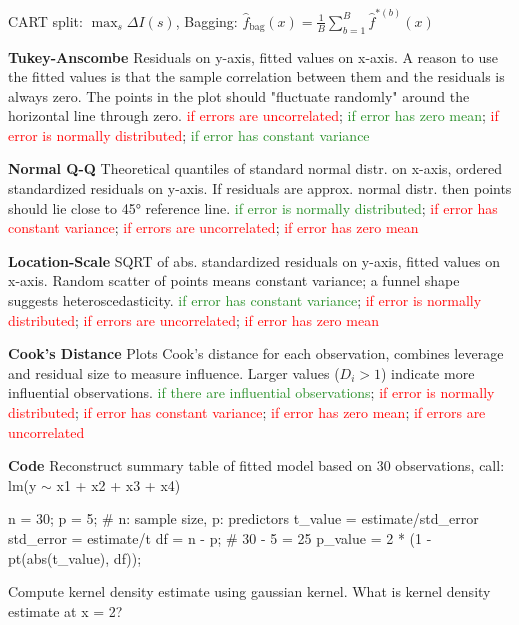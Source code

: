 \documentclass[9pt]{article}
\renewcommand\small{\footnotesize}
\newcommand{\topic}[1]{\small{\textbf{\textcolor{Sepia}{#1}}}}
\begin{document}
\begin{multicols*}{3}
CART split: $\max_s \Delta I(s)$,  
Bagging: $\hat{f}_{\text{bag}}(x) = \frac1B \sum_{b=1}^B \hat{f}^{*(b)}(x)$

\topic{Tukey-Anscombe}
Residuals on y-axis, fitted values on x-axis. A reason to use the fitted values is that the sample
correlation between them and the residuals is always zero. The points in the plot should
"fluctuate randomly" around the horizontal line through zero.
\textcolor{red}{if errors are uncorrelated};  \textcolor{ForestGreen}{if error has zero mean};
\textcolor{red}{if error is normally distributed};
\textcolor{ForestGreen}{if error has constant variance}

\topic{Normal Q-Q}
Theoretical quantiles of standard normal distr. on x-axis, ordered standardized residuals on y-axis.
If residuals are approx. normal distr. then points should lie close to 45° reference line.
\textcolor{ForestGreen}{if error is normally distributed};
\textcolor{red}{if error has constant variance}; 
\textcolor{red}{if errors are uncorrelated};
\textcolor{red}{if error has zero mean}

\topic{Location-Scale}
SQRT of abs. standardized residuals on y-axis, fitted values on x-axis. Random scatter of points means constant variance; a funnel shape suggests heteroscedasticity.
\textcolor{ForestGreen}{if error has constant variance};  
\textcolor{red}{if error is normally distributed};  
\textcolor{red}{if errors are uncorrelated};
\textcolor{red}{if error has zero mean}

\topic{Cook's Distance}
Plots Cook’s distance for each observation, combines leverage and residual size to measure influence. Larger values ($D_i > 1$) indicate more influential observations.
\textcolor{ForestGreen}{if there are influential observations};  
\textcolor{red}{if error is normally distributed};  
\textcolor{red}{if error has constant variance};
\textcolor{red}{if error has zero mean};  
\textcolor{red}{if errors are uncorrelated}

\textbf{Code}
\footnotesize{Reconstruct summary table of fitted model based on 30 observations, call: lm(y $\sim$ x1 + x2 + x3 + x4)}
\begin{rcode}
n = 30; p = 5; # n: sample size, p: predictors
t_value = estimate/std_error
std_error = estimate/t
df = n - p; # 30 - 5 = 25
p_value = 2 * (1 - pt(abs(t_value), df));
\end{rcode}
\footnotesize{Compute kernel density estimate using gaussian kernel. What is kernel density estimate at x = 2?}


\end{multicols*}
\end{document}
